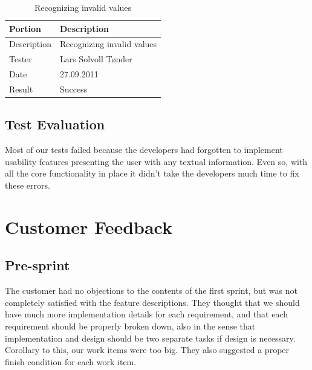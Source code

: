 \begin{table}[!ht] \footnotesize \center
\caption{Supporting configuration files \label{tab:sp1_tid06}}
\noindent{}
\end{table}

\begin{table}[!ht] \footnotesize \center
\caption{Recognizing invalid values \label{tab:sp1_tid07}}
\begin{tabular}{l l}
	\toprule
	Portion & Description \\
	\midrule
	Description &  Recognizing invalid values  \\
	Tester & Lars Solvoll Tønder \\
	Date & 27.09.2011 \\
	Result & Success\\
	\bottomrule
\end{tabular}
\end{table}

\subsection{Test Evaluation}
Most of our tests failed because the developers had forgotten to implement usability features presenting the user with any textual information. Even so, with all the core functionality in place it didn't take the developers much time to fix these errors.

\section{Customer Feedback}

\subsection{Pre-sprint}
The customer had no objections to the contents of the first sprint, but was not completely satisfied with the feature descriptions. They thought that we should have much more implementation details for each requirement, and that each requirement should be properly broken down, also in the sense that implementation and design should be two separate tasks if design is necessary. Corollary to this, our work items were too big. They also suggested a proper finish condition for each work item.

